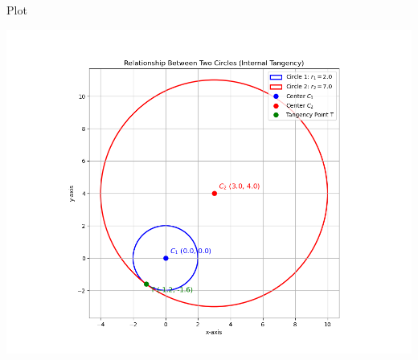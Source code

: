 \documentclass{beamer}
\begin{document}
    \begin{frame}{Plot}
        \begin{center}
            \includegraphics[width=\columnwidth, height=0.8\textheight, keepaspectratio]{figs/figure1.png}
        \end{center}
    \end{frame}
    
    
\end{document}
